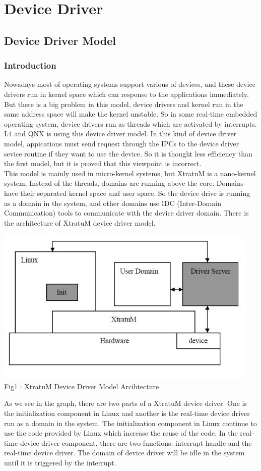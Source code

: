 \section{Device Driver}
\subsection{Device Driver Model}
\subsubsection{Introduction} 
Nowadays most of operating systems support various of devices, and these device drivers run in kernel space which can response to the applications immediately. But there is a big problem in this model, device drivers and kernel run in the same address space will make the kernel unstable. So in some real-time embedded operating system, device drivers run as threads which are activated by interrupts. L4 and QNX is using this device driver model. In this kind of device driver model, appications must send request through the IPCs to the device driver sevice routine if they want to use the device. So it is thought less efficiency than the first model, but it is proved that this viewpoint is incorrect. 
\\
This model is mainly used in micro-kernel systems, but XtratuM is a nano-kernel system. Instead of the threads, domains are running above the core. Domains have their separated kernel space and user space. So the device drive is running as a domain in the system, and other domains use IDC (Inter-Domain Communication) tools to communicate with the device driver domain. There is the architecture of XtratuM device driver model. 
\begin{center}
	\includegraphics[width=0.8\linewidth]{graph/dev01.jpg}
\\
	Fig1 : XtratuM Device Driver Model Arcihtecture
\end{center}
As we see in the graph, there are two parts of a XtratuM device driver. One is the initialization component in Linux and another is the real-time device driver run as a domain in the system. The initialization component in Linux continue to use the code provided by Linux which increase the reuse of the code. In the real-time device driver component, there are two functions: interrupt handle and the real-time device driver. The domain of device driver will be idle in the system until it is triggered by the interrupt. 

